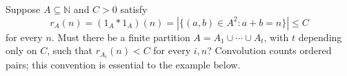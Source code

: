 Suppose $A\subseteq\mathbb N$ and $C>0$ satisfy
\[r_A(n)=(1_A*1_A)(n)=|\{(a,b)\in A^2:a+b=n\}|\le C
\]
for every $n$. Must there be a finite partition $A=A_1\cup\cdots\cup A_t$, with $t$ depending only on $C$, such that $r_{A_i}(n)<C$ for every $i,n$? Convolution counts ordered pairs; this convention is essential to the example below.
